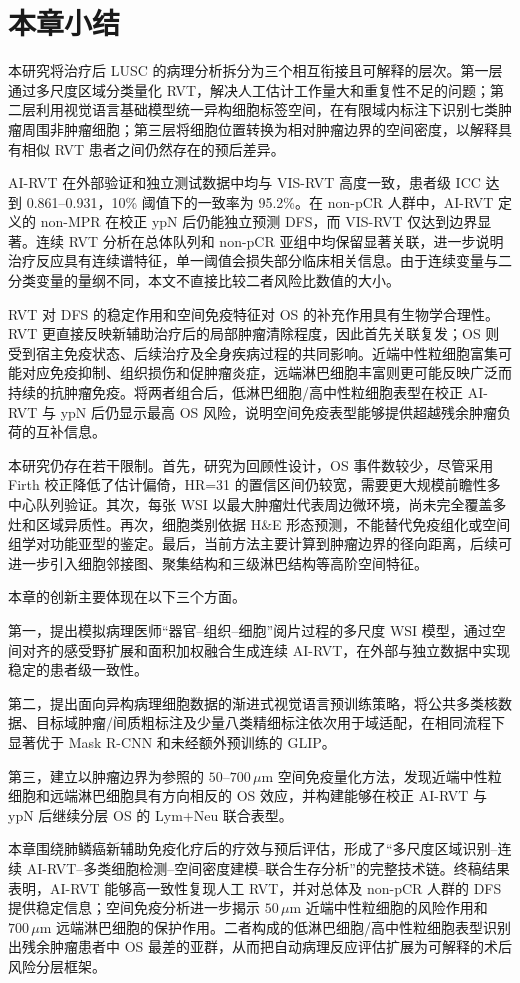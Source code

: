 \section{本章小结}
本研究将治疗后 LUSC 的病理分析拆分为三个相互衔接且可解释的层次。第一层通过多尺度区域分类量化 RVT，解决人工估计工作量大和重复性不足的问题；第二层利用视觉语言基础模型统一异构细胞标签空间，在有限域内标注下识别七类肿瘤周围非肿瘤细胞；第三层将细胞位置转换为相对肿瘤边界的空间密度，以解释具有相似 RVT 患者之间仍然存在的预后差异。

AI-RVT 在外部验证和独立测试数据中均与 VIS-RVT 高度一致，患者级 ICC 达到 0.861--0.931，10\% 阈值下的一致率为 95.2\%。在 non-pCR 人群中，AI-RVT 定义的 non-MPR 在校正 ypN 后仍能独立预测 DFS，而 VIS-RVT 仅达到边界显著。连续 RVT 分析在总体队列和 non-pCR 亚组中均保留显著关联，进一步说明治疗反应具有连续谱特征，单一阈值会损失部分临床相关信息。由于连续变量与二分类变量的量纲不同，本文不直接比较二者风险比数值的大小。

RVT 对 DFS 的稳定作用和空间免疫特征对 OS 的补充作用具有生物学合理性。RVT 更直接反映新辅助治疗后的局部肿瘤清除程度，因此首先关联复发；OS 则受到宿主免疫状态、后续治疗及全身疾病过程的共同影响。近端中性粒细胞富集可能对应免疫抑制、组织损伤和促肿瘤炎症，远端淋巴细胞丰富则更可能反映广泛而持续的抗肿瘤免疫。将两者组合后，低淋巴细胞/高中性粒细胞表型在校正 AI-RVT 与 ypN 后仍显示最高 OS 风险，说明空间免疫表型能够提供超越残余肿瘤负荷的互补信息。

本研究仍存在若干限制。首先，研究为回顾性设计，OS 事件数较少，尽管采用 Firth 校正降低了估计偏倚，HR=31 的置信区间仍较宽，需要更大规模前瞻性多中心队列验证。其次，每张 WSI 以最大肿瘤灶代表周边微环境，尚未完全覆盖多灶和区域异质性。再次，细胞类别依据 H\&E 形态预测，不能替代免疫组化或空间组学对功能亚型的鉴定。最后，当前方法主要计算到肿瘤边界的径向距离，后续可进一步引入细胞邻接图、聚集结构和三级淋巴结构等高阶空间特征。

本章的创新主要体现在以下三个方面。

第一，提出模拟病理医师“器官--组织--细胞”阅片过程的多尺度 WSI 模型，通过空间对齐的感受野扩展和面积加权融合生成连续 AI-RVT，在外部与独立数据中实现稳定的患者级一致性。

第二，提出面向异构病理细胞数据的渐进式视觉语言预训练策略，将公共多类核数据、目标域肿瘤/间质粗标注及少量八类精细标注依次用于域适配，在相同流程下显著优于 Mask R-CNN 和未经额外预训练的 GLIP。

第三，建立以肿瘤边界为参照的 $50$--$700\,\mu\mathrm{m}$ 空间免疫量化方法，发现近端中性粒细胞和远端淋巴细胞具有方向相反的 OS 效应，并构建能够在校正 AI-RVT 与 ypN 后继续分层 OS 的 Lym+Neu 联合表型。

本章围绕肺鳞癌新辅助免疫化疗后的疗效与预后评估，形成了“多尺度区域识别--连续 AI-RVT--多类细胞检测--空间密度建模--联合生存分析”的完整技术链。终稿结果表明，AI-RVT 能够高一致性复现人工 RVT，并对总体及 non-pCR 人群的 DFS 提供稳定信息；空间免疫分析进一步揭示 $50\,\mu\mathrm{m}$ 近端中性粒细胞的风险作用和 $700\,\mu\mathrm{m}$ 远端淋巴细胞的保护作用。二者构成的低淋巴细胞/高中性粒细胞表型识别出残余肿瘤患者中 OS 最差的亚群，从而把自动病理反应评估扩展为可解释的术后风险分层框架。
